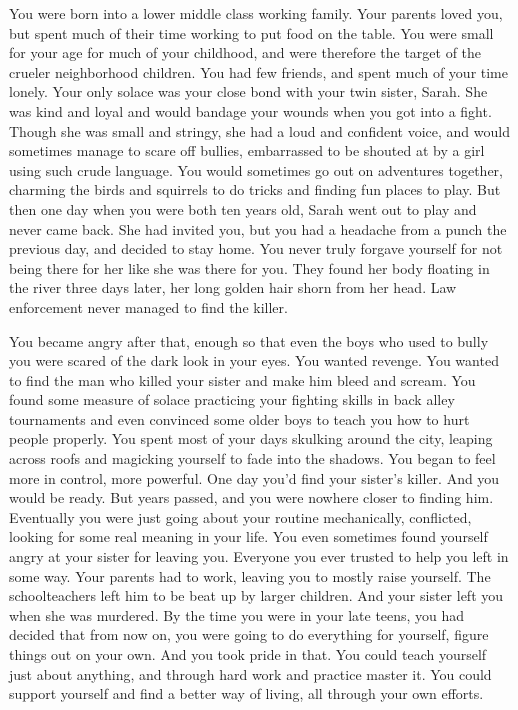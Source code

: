 \documentclass[char]{guildcamp3}
\begin{document}
\name{\cRogueOne{}}

You were born into a lower middle class working family. Your parents loved you, but spent much of their time working to put food on the table. You were small for your age for much of your childhood, and were therefore the target of the crueler neighborhood children. You had few friends, and spent much of your time lonely. Your only solace was your close bond with your twin sister, Sarah. She was kind and loyal and would bandage your wounds when you got into a fight. Though she was small and stringy, she had a loud and confident voice, and would sometimes manage to scare off bullies, embarrassed to be shouted at by a girl using such crude language. You would sometimes go out on adventures together, charming the birds and squirrels to do tricks and finding fun places to play. But then one day when you were both ten years old, Sarah went out to play and never came back. She had invited you, but you had a headache from a punch the previous day, and decided to stay home. You never truly forgave yourself for not being there for her like she was there for you. They found her body floating in the river three days later, her long golden hair shorn from her head. Law enforcement never managed to find the killer.

You became angry after that, enough so that even the boys who used to bully you were scared of the dark look in your eyes. You wanted revenge. You wanted to find the man who killed your sister and make him bleed and scream. You found some measure of solace practicing your fighting skills in back alley tournaments and even convinced some older boys to teach you how to hurt people properly. You spent most of your days skulking around the city, leaping across roofs and magicking yourself to fade into the shadows. You began to feel more in control, more powerful. One day you'd find your sister's killer. And you would be ready. But years passed, and you were nowhere closer to finding him. Eventually you were just going about your routine mechanically, conflicted, looking for some real meaning in your life. You even sometimes found yourself angry at your sister for leaving you. Everyone you ever trusted to help you left in some way. Your parents had to work, leaving you to mostly raise yourself. The schoolteachers left him to be beat up by larger children. And your sister left you when she was murdered. By the time you were in your late teens, you had decided that from now on, you were going to do everything for yourself, figure things out on your own. And you took pride in that. You could teach yourself just about anything, and through hard work and practice master it. You could support yourself and find a better way of living, all through your own efforts.
\end{document}

